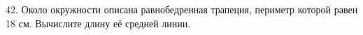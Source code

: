 42. Около окружности описана равнобедренная трапеция, периметр которой равен 18 см. Вычислите длину её средней линии.\\
